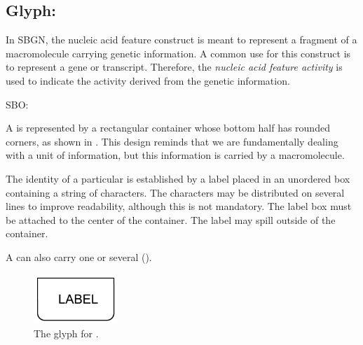 \subsection{Glyph: }
\label{sec:af:genetic}

In SBGN, the nucleic acid feature construct is meant to represent a fragment of a macromolecule carrying genetic information.  A common use for this construct is to represent a gene or transcript.  Therefore, the \emph{nucleic acid feature activity} is used to indicate the activity derived from the genetic information.

\begin{glyphDescription}

\glyphSboTerm SBO:

\glyphContainer A  is represented by a rectangular container whose bottom half has rounded corners, as shown in . This design reminds that we are fundamentally dealing with a unit of information, but this information is carried by a macromolecule.

\glyphLabel The identity of a particular  is established by a label placed in an unordered box containing a string of characters.  The characters may be distributed on several lines to improve readability, although this is not mandatory.  The label box must be attached to the center of the container.  The label may spill outside of the container.

A  can also carry one or several  (). 

\end{glyphDescription}

\begin{figure}[H]
  \centering
  \includegraphics[width = 1.25in]{images/genetic-plain}
  \caption{The \AF glyph for .}
  \label{fig:af:genetic}
\end{figure}